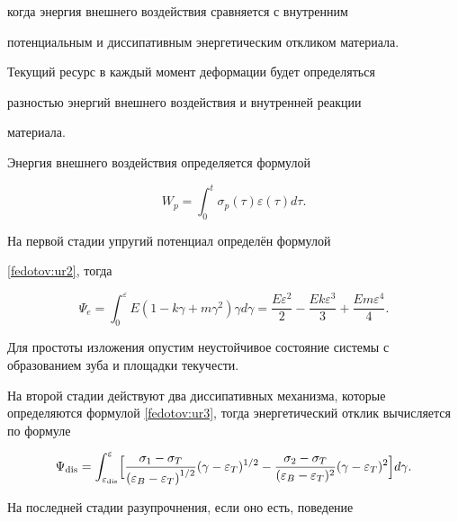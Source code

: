 когда энергия внешнего воздействия сравняется с внутренним

потенциальным и диссипативным энергетическим откликом материала.

Текущий ресурс в каждый момент деформации будет определяться

разностью энергий внешнего воздействия и внутренней реакции

материала.



Энергия внешнего воздействия определяется формулой

$$

W_p =\int _0^t \sigma _p (\tau)\varepsilon (\tau ) d\tau.

$$

На первой стадии упругий потенциал определён формулой

\eqref{fedotov:ur2}, тогда

\[

\Psi _{e} =\int _0^{\varepsilon }E(1-k\gamma +m\gamma ^2)\gamma

d\gamma  =\frac{E\varepsilon ^2}{2} -\frac{Ek\varepsilon ^3}{3}

+\frac{Em\varepsilon ^4}{4}.

\]



Для простоты изложения опустим неустойчивое состояние системы с образованием зуба и площадки текучести.



На второй стадии действуют два диссипативных механизма, которые определяются формулой \eqref{fedotov:ur3}, тогда энергетический отклик вычисляется по формуле



\vspace{-3mm}



\[

\Psi_{\rm dis} =\int _{\varepsilon _{\rm dis}}^{\varepsilon}

\Bigl[\frac{\sigma _1 -\sigma _T}{\left(\varepsilon_B

-\varepsilon_T \right)^{1/2}} (\gamma -\varepsilon _T)^{1/2}

-\frac{\sigma _2 -\sigma _T}{(\varepsilon _B -\varepsilon _T )^2 }

(\gamma -\varepsilon _T)^2 \Bigr]d\gamma.

\]



На последней стадии разупрочнения, если оно есть, поведение

